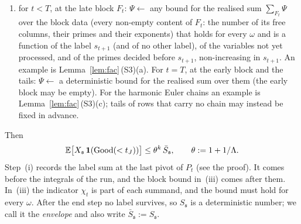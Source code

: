 \begin{lemma}
\begin{enumerate}[label=(\roman*)]
\item for $t<T$, at the late block $F_t$: $\Psi\leftarrow$ any bound for the realised sum $\sum_{F_t}\Psi$ over the
  block data (every non-empty content of $F_t$: the number of its free columns, their primes and their exponents) that
  holds for every $\omega$ and is a function of the label $s_{t+1}$ (and of no other label), of the variables not yet
  processed, and of the primes decided before $s_{t+1}$, non-increasing in $s_{t+1}$. An example is
  Lemma~\ref{lem:fac}\,(S3)(a). For $t=T$, at
  the early block and the tails: $\Psi\leftarrow$ a deterministic bound for the realised sum over them (the early block
  may be empty). For the harmonic Euler chains an example is Lemma~\ref{lem:fac}\,(S3)(c); tails of rows that carry no
  chain may instead be fixed in advance.
\end{enumerate}
Then
\[
  \mathbb{E}\bigl[X_{\mathfrak s}\,\mathbf 1(\mathrm{Good}(<t_J))\bigr]\le\theta^{k}\,\bar S_{\mathfrak s},\qquad\theta:=1+1/\Lambda .
\]
Step~(i) records the label sum at the last pivot of $P_t$ (see the proof). It comes before the integrals of the run, and
the block bound in~(iii) comes after them. In~(iii) the indicator $\chi_t$ is part of each summand, and the bound must
hold for every $\omega$. After the end step no label survives, so $S_{\mathfrak s}$ is a deterministic number; we
call it the \emph{envelope} and also write $\bar S_{\mathfrak s}:=S_{\mathfrak s}$.
\end{lemma}

